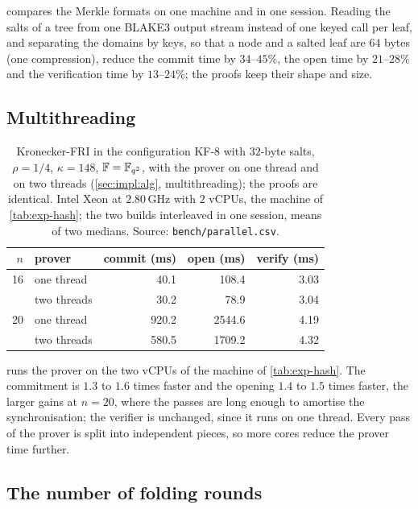  compares the Merkle formats on one machine and in one session.
Reading the salts of a tree from one BLAKE3 output stream instead of one keyed call per leaf, and separating the domains by keys, so that a node and a salted leaf are $64$ bytes (one compression), reduce the commit time by $34$--$45\%$, the open time by $21$--$28\%$ and the verification time by $13$--$24\%$; the proofs keep their shape and size.

\subsection{Multithreading}\label{sec:exp:par}

\begin{table}[t]
\centering
\small
\begin{tabular}{r l rrr}
\toprule
$n$ & prover & commit (ms) & open (ms) & verify (ms) \\
\midrule
16 & one thread & 40.1 & 108.4 & 3.03 \\
   & two threads & 30.2 & 78.9 & 3.04 \\
\midrule
20 & one thread & 920.2 & 2544.6 & 4.19 \\
   & two threads & 580.5 & 1709.2 & 4.32 \\
\bottomrule
\end{tabular}
\caption{Kronecker-FRI in the configuration KF-8 with $32$-byte salts, $\rho = 1/4$, $\kappa = 148$, $\mathbb{F} = \mathbb{F}_{q^2}$, with the prover on one thread and on two threads (\cref{sec:impl:alg}, multithreading); the proofs are identical. Intel Xeon at $2.80$\,GHz with $2$ vCPUs, the machine of \cref{tab:exp-hash}; the two builds interleaved in one session, means of two medians. Source: \texttt{bench/parallel.csv}.}
\label{tab:exp-par}
\end{table}

 runs the prover on the two vCPUs of the machine of \cref{tab:exp-hash}.
The commitment is $1.3$ to $1.6$ times faster and the opening $1.4$ to $1.5$ times faster, the larger gains at $n = 20$, where the passes are long enough to amortise the synchronisation; the verifier is unchanged, since it runs on one thread.
Every pass of the prover is split into independent pieces, so more cores reduce the prover time further.

\subsection{The number of folding rounds}\label{sec:exp:stop}

